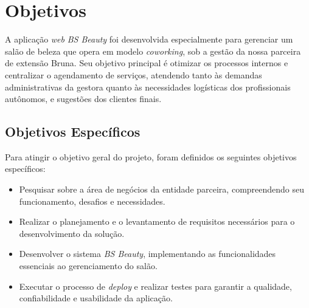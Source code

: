 \section{Objetivos}

A aplicação \emph{web} \emph{BS Beauty} foi desenvolvida especialmente para gerenciar um salão de beleza que opera em modelo \emph{coworking}, sob a gestão da nossa parceira de extensão Bruna. Seu objetivo principal é otimizar os processos internos e centralizar o agendamento de serviços, atendendo tanto às demandas administrativas da gestora quanto às necessidades logísticas dos profissionais autônomos, e sugestões dos clientes finais.

\subsection{Objetivos Específicos}

Para atingir o objetivo geral do projeto, foram definidos os seguintes objetivos específicos:

\begin{itemize}
	\item Pesquisar sobre a área de negócios da entidade parceira, compreendendo seu funcionamento, desafios e necessidades.
	\item Realizar o planejamento e o levantamento de requisitos necessários para o desenvolvimento da solução.
	\item Desenvolver o sistema \emph{BS Beauty}, implementando as funcionalidades essenciais ao gerenciamento do salão.
	\item Executar o processo de \emph{deploy} e realizar testes para garantir a qualidade, confiabilidade e usabilidade da aplicação.
\end{itemize}